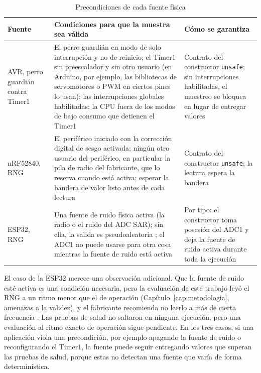 \begin{table}[H]
\centering
\caption{Precondiciones de cada fuente física}
\label{tab:condiciones_fuentes}
\small
\begin{tabularx}{\textwidth}{@{}L{0.17\textwidth}Y L{0.25\textwidth}@{}}
\toprule
\textbf{Fuente} & \textbf{Condiciones para que la muestra sea válida} & \textbf{Cómo se garantiza} \\
\midrule
AVR, perro guardián contra Timer1 & El perro guardián en modo de solo interrupción y no de reinicio; el Timer1 sin preescalador y sin otro usuario (en Arduino, por ejemplo, las bibliotecas de servomotores o PWM en ciertos pines lo usan); las interrupciones globales habilitadas; la CPU fuera de los modos de bajo consumo que detienen el Timer1 & Contrato del constructor \texttt{unsafe}; sin interrupciones habilitadas, el muestreo se bloquea en lugar de entregar valores \\
nRF52840, RNG & El periférico iniciado con la corrección digital de sesgo activada; ningún otro usuario del periférico, en particular la pila de radio del fabricante, que lo reserva cuando está activa; esperar la bandera de valor listo antes de cada lectura & Contrato del constructor \texttt{unsafe}; la lectura espera la bandera \\
ESP32, RNG & Una fuente de ruido física activa (la radio o el ruido del ADC SAR); sin ella, la salida es pseudoaleatoria \cite{EspressifRNG}; el ADC1 no puede usarse para otra cosa mientras la fuente de ruido está activa & Por tipo: el constructor toma posesión del ADC1 y deja la fuente de ruido activa durante toda la ejecución \\
\bottomrule
\end{tabularx}
\end{table}

El caso de la ESP32 merece una observación adicional. Que la fuente de ruido esté activa es una condición necesaria, pero la evaluación de este trabajo leyó el RNG a un ritmo menor que el de operación (Capítulo~\ref{cap:metodologia}, amenazas a la validez), y el fabricante recomienda no leerlo a más de cierta frecuencia \cite{EspressifRNG}. Las pruebas de salud no saltaron en ninguna ejecución, pero una evaluación al ritmo exacto de operación sigue pendiente. En los tres casos, si una aplicación viola una precondición, por ejemplo apagando la fuente de ruido o reconfigurando el Timer1, la fuente puede seguir entregando valores que superan las pruebas de salud, porque estas no detectan una fuente que varía de forma determinística.

